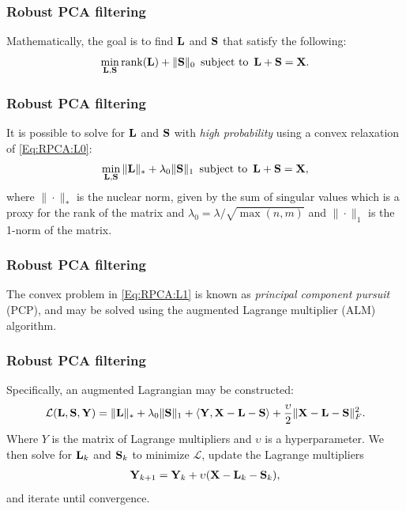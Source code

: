 \documentclass[12pt]{beamer}
\begin{document}
\begin{frame} 
	\frametitle{Robust PCA filtering	}
Mathematically, the goal is to find ${\bf L}$ and ${\bf S}$ that satisfy the following:
%
\begin{equation}
\min_{{\bf L},{\bf S}}\text{rank}({\bf L}) + \|{\bf S}\|_0 \,\,\,  \text{subject to} \,\,\, {\bf L} + {\bf S} = {\bf X}.\label{Eq:RPCA:L0}
\end{equation}
%

	
\end{frame}

\begin{frame} 
	\frametitle{Robust PCA filtering	}
	It is possible to solve for ${\bf L}$ and ${\bf S}$ with \emph{high probability} using a convex relaxation of \eqref{Eq:RPCA:L0}:
	\begin{equation}
	\min_{{\bf L},{\bf S}}\|{\bf L}\|_* + \lambda_0\|{\bf S}\|_1 \,\,\,  \text{subject to} \,\,\, {\bf L} + {\bf S} = {\bf X},\label{Eq:RPCA:L1}
	\end{equation}
	where $\|\cdot\|_*$ is the nuclear norm, given by the sum of singular values which is a proxy for the rank of the matrix and ${\lambda_0=\lambda/\sqrt{\max(n,m)}}$ and $\|\cdot\|_1$ is the 1-norm of the matrix. 
	
\end{frame}

\begin{frame} 
	\frametitle{Robust PCA filtering	}

The convex problem in \eqref{Eq:RPCA:L1} is known as \emph{principal component pursuit} (PCP), and may be solved using the augmented Lagrange multiplier (ALM) algorithm.  
	
\end{frame}

\begin{frame} 
	\frametitle{Robust PCA filtering	}
	
Specifically, an augmented Lagrangian may be constructed:
%
\begin{equation}
\mathcal{L}({\bf L},{\bf S},{\bf Y}) = \|{\bf L}\|_* + \lambda_0\|{\bf S}\|_1 + \langle{\bf Y},{\bf X}-{\bf L}-{\bf S}\rangle + \frac{\upsilon}{2}\|{\bf X}-{\bf L}-{\bf S}\|_F^2.
\end{equation}
%
Where $Y$ is the matrix of Lagrange multipliers and $\upsilon$ is a hyperparameter. 
We then solve for ${\bf L}_k$ and ${\bf S}_k$ to minimize $\mathcal{L}$, update the Lagrange multipliers 
\begin{align*}
{\bf Y}_{k+1} = {\bf Y}_k + \upsilon({\bf X}-{\bf L}_k-{\bf S}_k),
\end{align*}
and iterate until convergence.
	
\end{frame}
\end{document}
